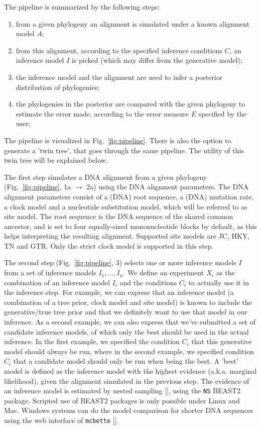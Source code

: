 The pipeline is summarized by the following steps:
\begin{enumerate}
  \item from a given phylogeny an alignment is simulated 
    under a known alignment model $\mathit{A}$;
  \item from this alignment, according to the specified inference conditions $\mathit{C}$, 
    an inference model $\mathit{I}$ is picked (which may differ from the 
    generative model);
  \item the inference model and the alignment are used 
    to infer a posterior distribution of phylogenies;
  \item the phylogenies in the posterior are compared with the given phylogeny 
    to estimate the error made, according to the error measure $\mathit{E}$ specified 
    by the user;
\end{enumerate}
The pipeline is visualized in Fig.~\ref{fig:pipeline}. 
There is also the option to generate a 'twin tree', 
that goes through the same pipeline. 
The utility of this twin tree will be explained below.

The first step simulates a DNA alignment from a given 
phylogeny (Fig.~\ref{fig:pipeline}, 1a $\rightarrow$ 2a)
using the DNA alignment parameters.
The DNA alignment parameters consist of a (DNA) root sequence, 
a (DNA) mutation rate, a clock model and a nucleotide substitution
model, which will be referred to as site model.
The root sequence is the DNA sequence of the shared common ancestor,
and is set to four equally-sized mononucleotide blocks by default, as this
helps interpreting the resulting alignment.
Supported site models are JC, HKY, TN and GTR. Only the strict
clock model is supported in this step.

The second step (Fig.~\ref{fig:pipeline}, 3)
selects one or more inference models $I$ from a set of inference 
models $I_{1},\dots,I_{n}$. 
We define an experiment $X_{i}$ as the combination of 
an inference model $I_{i}$ and the conditions $C_{i}$ 
to actually use it in the inference step.
For example, we can express that an inference
model (a combination of a tree prior, clock model and site model) 
is known to include the generative/true tree prior and that 
we definitely want to use that model in our inference. 
As a second example, we can also express that we've submitted a set of 
candidate inference models,
of which only the best should be used in the actual inference.
In the first example, we specified the condition $C_{i}$ that this
generative model should always be run, where in the second example,
we specified condition $C_{i}$ that a candidate model should only be run
when being the best.
A 'best' model is defined as the inference model with
the highest evidence (a.k.a. marginal likelihood), given the alignment 
simulated in the previous step.
The evidence of an inference model is estimated by nested 
sampling [\cite{maturana2018model}], using the \verb;NS; BEAST2 package. 
Scripted use of BEAST2 packages is only possible under Linux and Mac.
Windows systems can do the model comparison for shorter DNA sequences 
using the web interface of \verb;mcbette; [\cite{mcbette}].

